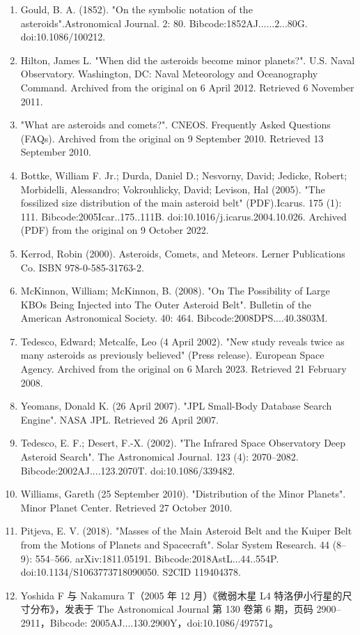 \begin{enumerate}
\item Gould, B. A. (1852). "On the symbolic notation of the asteroids".Astronomical Journal. 2: 80. Bibcode:1852AJ......2...80G. doi:10.1086/100212.
\item Hilton, James L. "When did the asteroids become minor planets?". U.S. Naval Observatory. Washington, DC: Naval Meteorology and Oceanography Command. Archived from the original on 6 April 2012. Retrieved 6 November 2011.
\item "What are asteroids and comets?". CNEOS. Frequently Asked Questions (FAQs). Archived from the original on 9 September 2010. Retrieved 13 September 2010.
\item Bottke, William F. Jr.; Durda, Daniel D.; Nesvorny, David; Jedicke, Robert; Morbidelli, Alessandro; Vokrouhlicky, David; Levison, Hal (2005). "The fossilized size distribution of the main asteroid belt" (PDF).Icarus. 175 (1): 111. Bibcode:2005Icar..175..111B. doi:10.1016/j.icarus.2004.10.026. Archived (PDF) from the original on 9 October 2022.
\item Kerrod, Robin (2000). Asteroids, Comets, and Meteors. Lerner Publications Co. ISBN 978-0-585-31763-2.
\item McKinnon, William; McKinnon, B. (2008). "On The Possibility of Large KBOs Being Injected into The Outer Asteroid Belt". Bulletin of the American Astronomical Society. 40: 464. Bibcode:2008DPS....40.3803M.
\item Tedesco, Edward; Metcalfe, Leo (4 April 2002). "New study reveals twice as many asteroids as previously believed" (Press release). European Space Agency. Archived from the original on 6 March 2023. Retrieved 21 February 2008.
\item Yeomans, Donald K. (26 April 2007). "JPL Small-Body Database Search Engine". NASA JPL. Retrieved 26 April 2007.
\item Tedesco, E. F.; Desert, F.-X. (2002). "The Infrared Space Observatory Deep Asteroid Search". The Astronomical Journal. 123 (4): 2070–2082. Bibcode:2002AJ....123.2070T. doi:10.1086/339482.
\item Williams, Gareth (25 September 2010). "Distribution of the Minor Planets". Minor Planet Center. Retrieved 27 October 2010.
\item Pitjeva, E. V. (2018). "Masses of the Main Asteroid Belt and the Kuiper Belt from the Motions of Planets and Spacecraft". Solar System Research. 44 (8–9): 554–566. arXiv:1811.05191. Bibcode:2018AstL...44..554P. doi:10.1134/S1063773718090050. S2CID 119404378.
\item Yoshida F 与 Nakamura T（2005 年 12 月）《微弱木星 L4 特洛伊小行星的尺寸分布》，发表于 The Astronomical Journal 第 130 卷第 6 期，页码 2900–2911，Bibcode: 2005AJ....130.2900Y，doi:10.1086/497571。

\end{enumerate}
